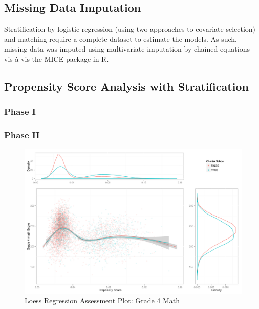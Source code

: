 \documentclass[letterpaper,12p,twoside]{article} %
\begin{document}
\subsection{Missing Data Imputation}
Stratification by logistic regression (using two approaches to covariate selection) and matching require a complete dataset to estimate the models. As such, missing data was imputed using multivariate imputation by chained equations  vis-\`a-vis the MICE package  in R.


%

\subsection{Propensity Score Analysis with Stratification}

\subsubsection{Phase I}

\subsubsection{Phase II}

\begin{figure}[ht]
\begin{center}
\includegraphics[width=\textwidth]{../Figures2009/g4math-loess.pdf}
\caption{Loess Regression Assessment Plot: Grade 4 Math}
\label{fig:g4math:loess}
\end{center}
\end{figure}
\end{document}
